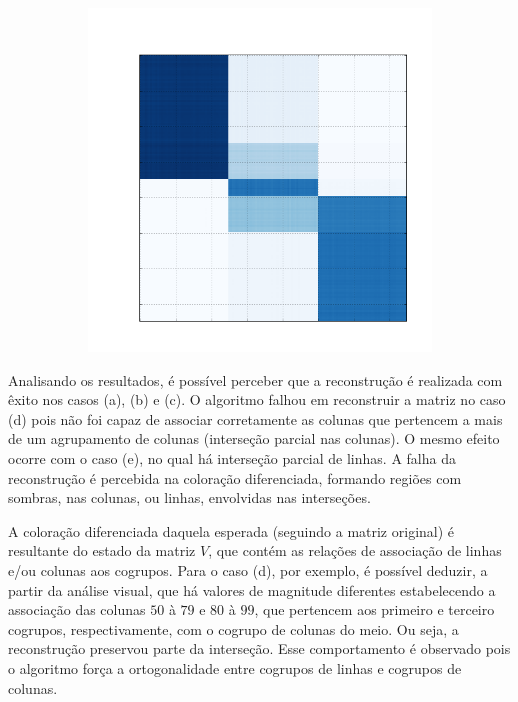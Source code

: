 \documentclass[
    12pt,                %
    oneside,            %
    a4paper,            %
    english,            %
    brazil                %
    ]{abntex2ppgsi}
\begin{document}
\begin{figure}[H]
\begin{subfigure}[b]{0.18\textwidth}
        \caption{}
    \end{subfigure}
    \begin{subfigure}[b]{0.18\textwidth}
        \includegraphics[width=\textwidth]{img/e-reconstruction-onmtf.png}
            \caption{}
    \end{subfigure}
\label{fig:reconstruction:onmtf}
\end{figure}


Analisando os resultados, é possível perceber que a reconstrução é realizada com êxito nos casos (a), (b) e (c).
O algoritmo falhou em reconstruir a matriz no caso (d) pois não foi capaz de associar corretamente as colunas que pertencem a mais de um agrupamento de colunas (interseção parcial nas colunas).
O mesmo efeito ocorre com o caso (e), no qual há interseção parcial de linhas.
A falha da reconstrução é percebida na coloração diferenciada, formando regiões com sombras, nas colunas, ou linhas, envolvidas nas interseções.

A coloração diferenciada daquela esperada (seguindo a matriz original) é resultante do estado da matriz $V$, que contém as relações de associação de linhas e/ou colunas aos cogrupos.
Para o caso (d), por exemplo, é possível deduzir, a partir da análise visual, que há valores de magnitude diferentes estabelecendo a associação das colunas $50$ à $79$ e $80$ à $99$, que pertencem aos primeiro e terceiro cogrupos, respectivamente, com o cogrupo de colunas do meio.
Ou seja, a reconstrução preservou parte da interseção.
Esse comportamento é observado pois o algoritmo força a ortogonalidade entre cogrupos de linhas e cogrupos de colunas.
\end{document}
